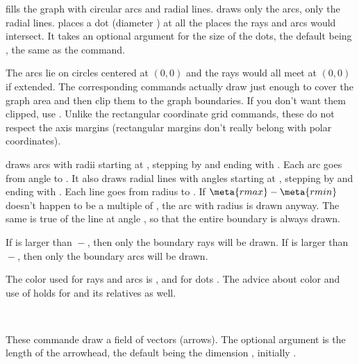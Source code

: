 \documentclass[letterpaper]{article}
\begin{document}
 fills the graph with circular arcs and radial lines.
 draws only the arcs,  only the radial lines.
 places a dot (diameter ) at all the places
the rays and arcs would intersect. It takes an optional argument for the
size of the dots, the default being , the same as the
 command.

The arcs lie on circles centered at $(0,0)$ and the rays would all meet
at $(0,0)$ if extended. The corresponding \MF{} commands actually draw
just enough to cover the graph area and then clip them to the graph
boundaries. If you don't want them clipped, use . Unlike
the rectangular coordinate grid commands, these do not respect the axis
margins (rectangular margins don't really belong with polar coordinates).

 draws arcs with radii starting at , stepping by
 and ending with . Each arc goes from angle
 to . It also draws radial lines with angles
starting at , stepping by  and ending with
. Each line goes from radius  to . If
$\meta{rmax}-\meta{rmin}$ doesn't happen to be a multiple of
, the arc with radius  is drawn anyway. The same
is true of the line at angle , so that the entire boundary is
always drawn.

If  is larger than ${}-{}$, then only
the boundary rays will be drawn. If  is larger than
${}-{}$, then only the boundary arcs will be
drawn.

The color used for rays and arcs is , and for dots
. The advice about color and use of  holds
for  and its relatives as well.

\begin{cd}
%
\\
%
%
%
\end{cd}

These commande draw a field of vectors (arrows). The optional argument
is the length of the arrowhead, the default being the dimension
, initially \dim{3pt}.
\end{document}
